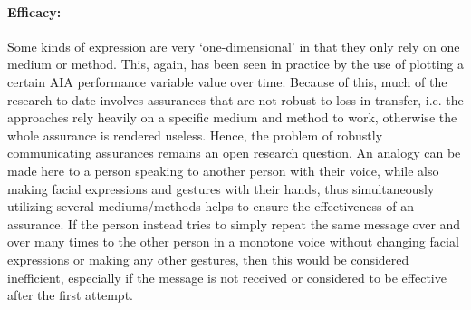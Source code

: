     \paragraph{Efficacy:} Some kinds of expression are very `one-dimensional' in that they only rely on one medium or method. This, again, has been seen in practice by the use of plotting a certain AIA performance variable value over time. Because of this, much of the research to date involves assurances that are not robust to loss in transfer, i.e. the approaches rely heavily on a specific medium and method to work, otherwise the whole assurance is rendered useless. 
    Hence, the problem of robustly communicating assurances remains an open research question. 
    An analogy can be made here to a person speaking to another person with their voice, while also making facial expressions and gestures with their hands, thus simultaneously utilizing several mediums/methods helps to ensure the effectiveness of an assurance. 
    If the person instead tries to simply repeat the same message over and over many times to the other person in a monotone voice without changing facial expressions or making any other gestures, then this would be considered inefficient, especially if the message is not received or considered to be effective after the first attempt. %
    
